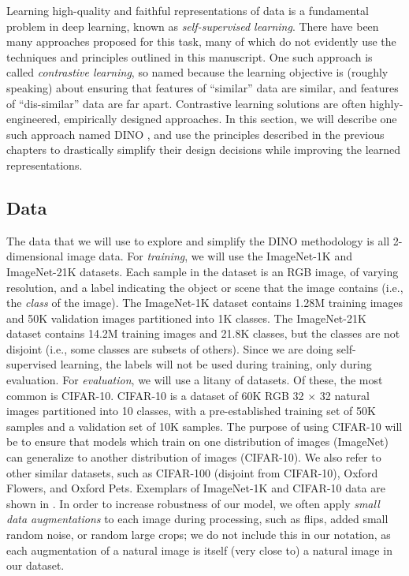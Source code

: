 \documentclass[../../book-main.tex]{subfiles}
\begin{document}
Learning high-quality and faithful representations of data is a fundamental problem in deep learning, known as \textit{self-supervised learning}. There have been many approaches proposed for this task, many of which do not evidently use the techniques and principles outlined in this manuscript. One such approach is called \textit{contrastive learning}, so named because the learning objective is (roughly speaking) about ensuring that features of ``similar'' data are similar, and features of ``dis-similar'' data are far apart. Contrastive learning solutions are often highly-engineered, empirically designed approaches. In this section, we will describe one such approach named DINO \citep{caron2021emerging}, and use the principles described in the previous chapters to drastically simplify their design decisions while improving the learned representations.

\subsection{Data}\label{sub:contrastive_learning_data}

The data that we will use to explore and simplify the DINO methodology is all 2-dimensional image data. For \textit{training}, we will use the ImageNet-1K and ImageNet-21K datasets. Each sample in the dataset is an RGB image, of varying resolution, and a label indicating the object or scene that the image contains (i.e., the \textit{class} of the image). The ImageNet-1K dataset contains 1.28M training images and 50K validation images partitioned into 1K classes. The ImageNet-21K dataset contains 14.2M training images and 21.8K classes, but the classes are not disjoint (i.e., some classes are subsets of others). Since we are doing self-supervised learning, the labels will not be used during training, only during evaluation. For \textit{evaluation}, we will use a litany of datasets. Of these, the most common is CIFAR-10. CIFAR-10 is a dataset of 60K RGB 32 \(\times\) 32 natural images partitioned into 10 classes, with a pre-established training set of 50K samples and a validation set of 10K samples. The purpose of using CIFAR-10 will be to ensure that models which train on one distribution of images (ImageNet) can generalize to another distribution of images (CIFAR-10). We also refer to other similar datasets, such as CIFAR-100 (disjoint from CIFAR-10), Oxford Flowers, and Oxford Pets. Exemplars of ImageNet-1K and CIFAR-10 data are shown in . In order to increase robustness of our model, we often apply \textit{small data augmentations} to each image during processing, such as flips, added small random noise, or random large crops; we do not include this in our notation, as each augmentation of a natural image is itself (very close to) a natural image in our dataset.
\end{document}
